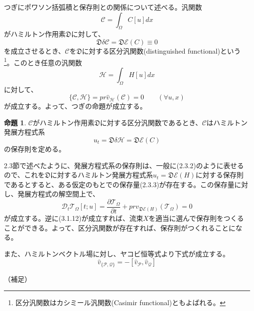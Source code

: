 \documentclass[a4paper, 11pt]{report}
\theoremstyle{definition}
\newtheorem{proposition}{命題}[section]
\begin{document}
 つぎにポワソン括弧積と保存則との関係について述べる。汎関数
\begin{equation}
\mathcal{C} = \int_\Omega C[u]dx  %
\end{equation}
がハミルトン作用素$\mathfrak{D}$に対して、
\begin{equation}
\mathfrak{D}\delta\mathcal{C} = \mathfrak{D}\mathcal{E}(C)\equiv 0
\end{equation}
を成立させるとき、$\mathcal{C}$を$\mathfrak{D}$に対する区分汎関数(distinguished functional)という\footnote{区分汎関数はカシミール汎関数(Casimir functional)ともよばれる。}。このとき任意の汎関数
\begin{equation*}
\mathcal{H} = \int_\Omega H[u]dx
\end{equation*}
に対して、
\begin{equation*}
\{ \mathcal{C}, \mathcal{H} \} = pr\hat{v}_\mathcal{H}(\mathcal{C}) = 0 \qquad (\forall u,x) %
\end{equation*}
が成立する。よって、つぎの命題が成立する。
\begin{proposition}
 $\mathcal{C}$がハミルトン作用素$\mathfrak{D}$に対する区分汎関数であるとき、$\mathcal{C}$はハミルトン発展方程式系
\begin{equation*}
u_t = \mathfrak{D}\delta\mathcal{H} = \mathfrak{D}\mathcal{E}(C)
\end{equation*}
の保存則を定める。
\end{proposition}

 2.3節で述べたように、発展方程式系の保存則は、一般に(2.3.2)のように表せるので、これを$\mathfrak{D}$に対するハミルトン発展方程式系$u_t = \mathfrak{D}\mathcal{E}(H)$に対する保存則であるとすると、ある仮定のもとでの保存量(2.3.3)が存在する。この保存量に対し、発展方程式の解空間上で、
\begin{equation}
\mathcal{D}_t\mathcal{T}_\Omega[t;u] = \frac{\partial \mathcal{T}_\Omega}{\partial t} + prv_{\mathfrak{D}\mathcal{E}(H)}(\mathcal{T}_\Omega ) = 0  %
\end{equation}
が成立する。逆に(3.1.12)が成立すれば、流束$X$を適当に選んで保存則をつくることができる。よって、区分汎関数が存在すれば、保存則がつくれることになる。

 また、ハミルトンベクトル場に対し、ヤコビ恒等式より下式が成立する。
\begin{equation}
\hat{v}_{\{ \mathcal{P}, \mathcal{Q} \} } = -[\hat{v}_\mathcal{P}, \hat{v}_\mathcal{Q}]  %
\end{equation}

 （補足）\\
 
\end{document}
